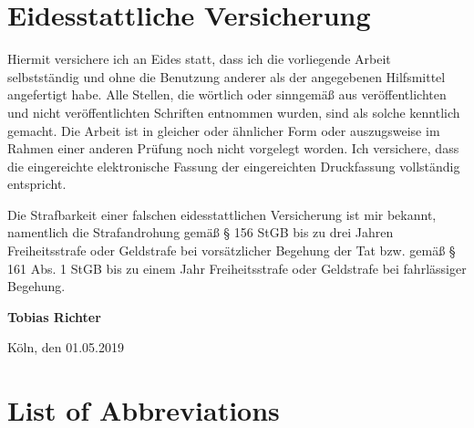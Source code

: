 \documentclass[a4paper, 12pt]{article}
\begin{document}
\section*{Eidesstattliche Versicherung}
\label{sec:SOOA}

\vspace{2.5cm}


Hiermit versichere ich an Eides statt, dass ich die vorliegende Arbeit selbstständig und ohne die Benutzung anderer als der angegebenen Hilfsmittel angefertigt habe. Alle Stellen, die wörtlich oder sinngemäß aus veröffentlichten und nicht veröffentlichten Schriften entnommen wurden, sind als solche kenntlich gemacht. Die Arbeit ist in gleicher oder ähnlicher Form oder auszugsweise im Rahmen einer anderen Prüfung noch nicht vorgelegt worden. Ich versichere, dass die eingereichte elektronische Fassung der eingereichten Druckfassung vollständig entspricht.

\vspace{1cm}

\noindent
Die Strafbarkeit einer falschen eidesstattlichen Versicherung ist mir bekannt, namentlich die Strafandrohung gemäß § 156 StGB bis zu drei Jahren Freiheitsstrafe oder Geldstrafe bei vorsätzlicher Begehung der Tat bzw. gemäß § 161 Abs. 1 StGB bis zu einem Jahr Freiheitsstrafe oder Geldstrafe bei fahrlässiger Begehung.

\vspace{3cm}
\noindent
\textbf{Tobias Richter}

\vspace{0.5cm}
\noindent
Köln, den 01.05.2019
\clearpage

\setcounter{page}{1}
\tableofcontents
\clearpage
\listoffigures
\clearpage
\listoftables
\clearpage

\section*{List of Abbreviations} 
\begin{acronym}[GCRM]
\end{acronym}
\clearpage
\end{document}
